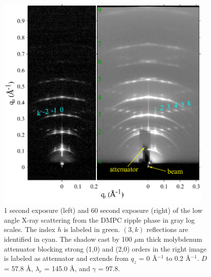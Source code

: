 \begin{figure}[htbp]
  \centering
  \includegraphics[width=0.95\textwidth]{figures/ripple/ripple083and085}
  \caption{1 second exposure (left) and 60 second exposure (right) of the low
  angle X-ray scattering from the DMPC ripple phase in gray log scales. 
  The index $h$ is 
  labeled in green. $(3,k)$ reflections are identified in cyan. 
  The shadow cast by 100 $\mu$m thick molybdenum attenuator blocking
  strong (1,0) and (2,0) orders in the right image is labeled as attenuator
  and extends from $q_z$ = 0 \AA$^{-1}$ to 0.2 \AA$^{-1}$.
  $D$ = 57.8 \AA, $\lambda_r$ = 145.0 \AA, and $\gamma$ = 97.8\textdegree.}
  \label{fig:ripple_laxs_images}  
\end{figure} 

